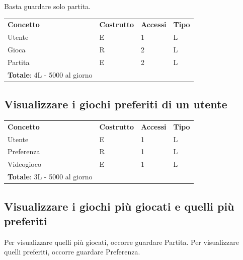\documentclass[a4paper,12pt]{report}
\begin{document}
Basta guardare solo partita.

\begin{table}[h!]
\begin{center}
	\begin{tabular}{ | m{4cm} P{4cm} P{4cm} P{4cm} | }
	\textbf{Concetto} & \textbf{Costrutto} & \textbf{Accessi} & \textbf{Tipo} \\
	Utente  & E & 1 & L \\ \hline
	Gioca   & R & 2 & L \\ \hline
	Partita & E & 2 & L \\ \hline
	\textbf{Totale}: 4L - 5000 al giorno & & & \\
	\hline
	\end{tabular}
\end{center}
\end{table}

\newpage

\subsection*{Visualizzare i giochi preferiti di un utente}

\begin{table}[h!]
\begin{center}
	\begin{tabular}{ | m{4cm} P{4cm} P{4cm} P{4cm} | }
	\textbf{Concetto} & \textbf{Costrutto} & \textbf{Accessi} & \textbf{Tipo} \\
	Utente     & E & 1 & L \\ \hline
	Preferenza & R & 1 & L \\ \hline
	Videogioco & E & 1 & L \\ \hline
	\textbf{Totale}: 3L - 5000 al giorno & & & \\
	\hline
	\end{tabular}
\end{center}
\end{table}

\subsection*{Visualizzare i giochi più giocati e quelli più preferiti}

Per visualizzare quelli più giocati, occorre guardare Partita. Per visualizzare quelli preferiti, occorre guardare Preferenza.
\end{document}
